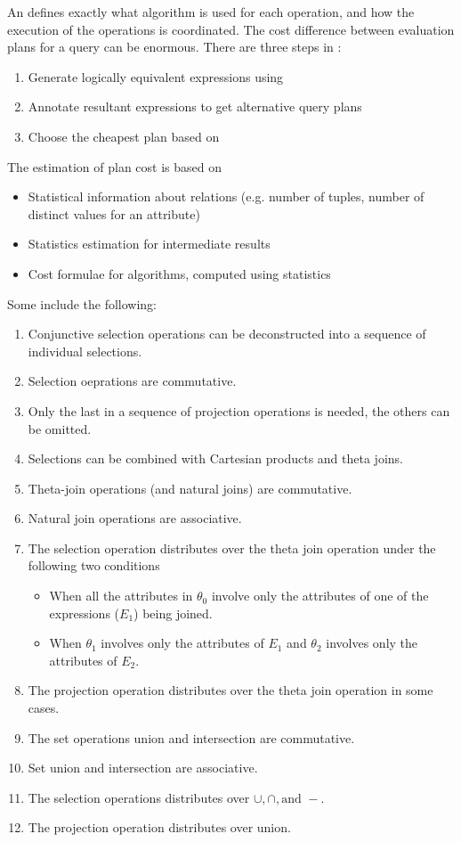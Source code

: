 \documentclass{article}
\begin{document}
An  defines exactly what algorithm is used for each operation, and how the execution of the operations is coordinated. The cost difference between evaluation plans for a query can be enormous. There are three steps in :
\begin{enumerate}
  \item Generate logically equivalent expressions using  
  \item Annotate resultant expressions to get alternative query plans 
  \item Choose the cheapest plan based on 
\end{enumerate}
The estimation of plan cost is based on 
\begin{itemize}
  \item Statistical information about relations (e.g. number of tuples, number of distinct values for an attribute)
  \item Statistics estimation for intermediate results 
  \item Cost formulae for algorithms, computed using statistics 
\end{itemize}
Some  include the following:
\begin{enumerate}
  \item Conjunctive selection operations can be deconstructed into a sequence of individual selections. 
  \item Selection oeprations are commutative. 
  \item Only the last in a sequence of projection operations is needed, the others can be omitted. 
  \item Selections can be combined with Cartesian products and theta joins.
  \item Theta-join operations (and natural joins) are commutative.
  \item Natural join operations are associative.
  \item The selection operation distributes over the theta join operation under the following two conditions 
    \begin{itemize}
      \item When all the attributes in $\theta_0$ involve only the attributes of one of the expressions ($E_1$) being joined. 
      \item When $\theta_1$ involves only the attributes of $E_1$ and $\theta_2$ involves only the attributes of $E_2$. 
    \end{itemize}
  \item The projection operation distributes over the theta join operation in some cases. 
  \item The set operations union and intersection are commutative. 
  \item Set union and intersection are associative.
  \item The selection operations distributes over $\cup , \cap, \textrm{and }-$. 
  \item The projection operation distributes over union. 
\end{enumerate}
\end{document}
